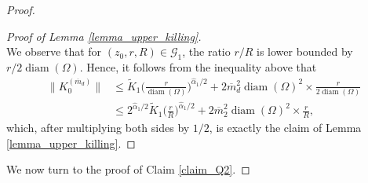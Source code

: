 \documentclass{article}
\theoremstyle{definition}
\theoremstyle{remark}
\theoremstyle{remark}
\begin{document}
\begin{proof}
\begin{proof}[Proof of Lemma \ref{lemma_upper_killing}]
\begin{equation*}
\end{equation*}
We observe that for $(z_0,r,R) \in \mathcal{G}_1$, the ratio $r/R$ is lower bounded by $r/2\operatorname{diam}(\Omega)$. Hence, it follows from the inequality above that
\begin{align*}
    \| K_{0}^{(\overline{m}_d)} \| &\leq \tilde K_1 \bigg(\frac{r}{\operatorname{diam}(\Omega)}\bigg)^{\hat \alpha_1 /2} + 2\overline{m}_d^2\operatorname{diam}(\Omega)^2\times \frac{r}{2\operatorname{diam}(\Omega)} \\
    &\leq 2^{\hat \alpha_1 /2} \tilde K_1 \bigg(\frac{r}{R}\bigg)^{\hat \alpha_1 /2} + 2\overline{m}_2^2\operatorname{diam}(\Omega)^2\times \frac{r}{R},
\end{align*}
which, after multiplying both sides by $1/2$, is exactly the claim of Lemma \ref{lemma_upper_killing}.
\end{proof}

We now turn to the proof of Claim \ref{claim_Q2}.


\end{proof}
\end{document}
